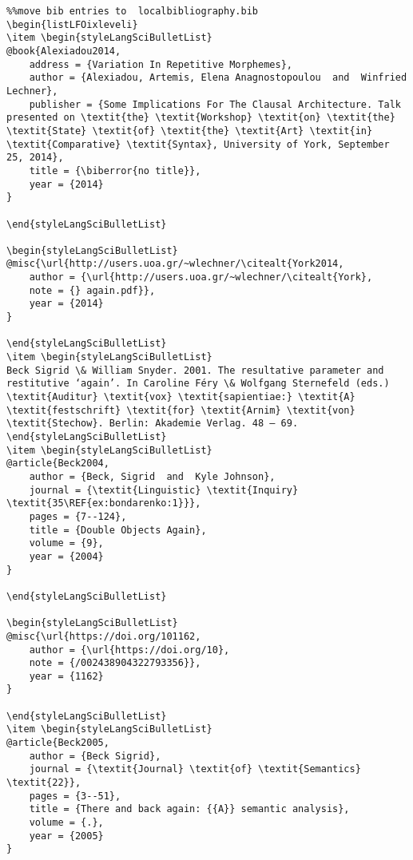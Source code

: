 \documentclass[output=paper,modfonts,nonflat,
 hidelinks
]{langsci/langscibook}
\begin{document}
\begin{verbatim}%%move bib entries to  localbibliography.bib
\begin{listLFOixleveli}
\item \begin{styleLangSciBulletList}
@book{Alexiadou2014,
	address = {Variation In Repetitive Morphemes},
	author = {Alexiadou, Artemis, Elena Anagnostopoulou  and  Winfried Lechner},
	publisher = {Some Implications For The Clausal Architecture. Talk presented on \textit{the} \textit{Workshop} \textit{on} \textit{the} \textit{State} \textit{of} \textit{the} \textit{Art} \textit{in} \textit{Comparative} \textit{Syntax}, University of York, September 25, 2014},
	title = {\biberror{no title}},
	year = {2014}
}

\end{styleLangSciBulletList}

\begin{styleLangSciBulletList}
@misc{\url{http://users.uoa.gr/~wlechner/\citealt{York2014,
	author = {\url{http://users.uoa.gr/~wlechner/\citealt{York},
	note = {} again.pdf}},
	year = {2014}
}

\end{styleLangSciBulletList}
\item \begin{styleLangSciBulletList}
Beck Sigrid \& William Snyder. 2001. The resultative parameter and restitutive ‘again’. In Caroline Féry \& Wolfgang Sternefeld (eds.) \textit{Auditur} \textit{vox} \textit{sapientiae:} \textit{A} \textit{festschrift} \textit{for} \textit{Arnim} \textit{von} \textit{Stechow}. Berlin: Akademie Verlag. 48 – 69.
\end{styleLangSciBulletList}
\item \begin{styleLangSciBulletList}
@article{Beck2004,
	author = {Beck, Sigrid  and  Kyle Johnson},
	journal = {\textit{Linguistic} \textit{Inquiry} \textit{35\REF{ex:bondarenko:1}}},
	pages = {7--124},
	title = {Double Objects Again},
	volume = {9},
	year = {2004}
}

\end{styleLangSciBulletList}

\begin{styleLangSciBulletList}
@misc{\url{https://doi.org/101162,
	author = {\url{https://doi.org/10},
	note = {/002438904322793356}},
	year = {1162}
}

\end{styleLangSciBulletList}
\item \begin{styleLangSciBulletList}
@article{Beck2005,
	author = {Beck Sigrid},
	journal = {\textit{Journal} \textit{of} \textit{Semantics} \textit{22}},
	pages = {3--51},
	title = {There and back again: {{A}} semantic analysis},
	volume = {.},
	year = {2005}
}


\end{verbatim}
\end{document}
